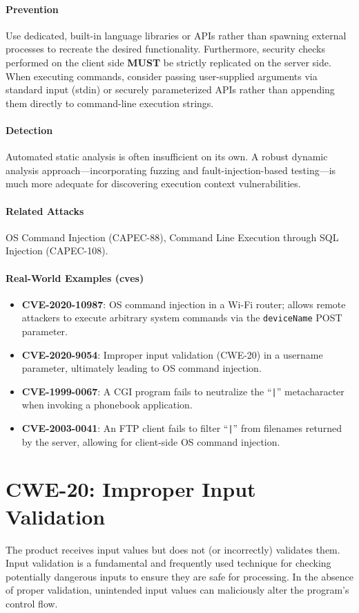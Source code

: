 \paragraph{Prevention} Use dedicated, built-in language libraries or APIs rather than spawning external processes to recreate the desired functionality. Furthermore, security checks performed on the client side \textbf{MUST} be strictly replicated on the server side. When executing commands, consider passing user-supplied arguments via standard input (stdin) or securely parameterized APIs rather than appending them directly to command-line execution strings.

\paragraph{Detection} Automated static analysis is often insufficient on its own. A robust dynamic analysis approach—incorporating fuzzing and fault-injection-based testing—is much more adequate for discovering execution context vulnerabilities.

\paragraph{Related Attacks} OS Command Injection (CAPEC-88), Command Line Execution through SQL Injection (CAPEC-108).

\paragraph{Real-World Examples (\glspl{cve})}
\begin{itemize}
    \item \textbf{CVE-2020-10987}: OS command injection in a Wi-Fi router; allows remote attackers to execute arbitrary system commands via the \texttt{deviceName} POST parameter.
    \item \textbf{CVE-2020-9054}: Improper input validation (CWE-20) in a username parameter, ultimately leading to OS command injection.
    \item \textbf{CVE-1999-0067}: A CGI program fails to neutralize the ``\texttt{|}'' metacharacter when invoking a phonebook application.
    \item \textbf{CVE-2003-0041}: An FTP client fails to filter ``\texttt{|}'' from filenames returned by the server, allowing for client-side OS command injection.
\end{itemize}

\section{CWE-20: Improper Input Validation}
The product receives input values but does not (or incorrectly) validates them. Input validation is a fundamental and frequently used technique for checking potentially dangerous inputs to ensure they are safe for processing. In the absence of proper validation, unintended input values can maliciously alter the program's control flow.

